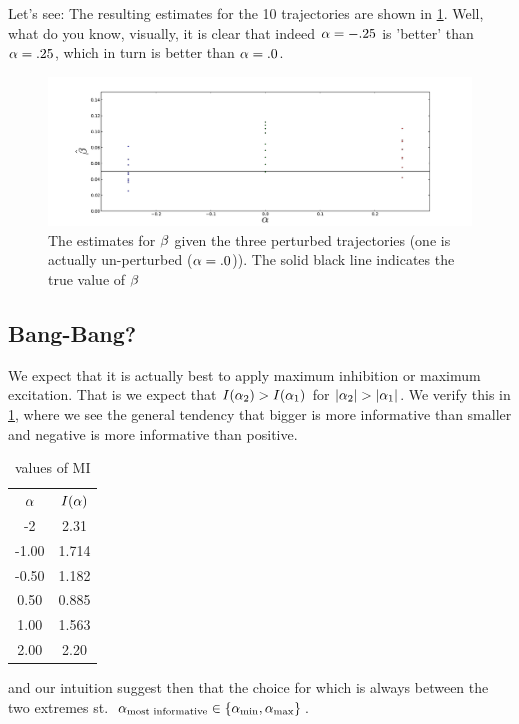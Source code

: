 Let's see: The resulting estimates for the 10 trajectories are shown in
\cref{fig:perturbed_estimates}. Well, what do you know, visually, it is clear
that indeed $\alpha=-.25$ is  'better' than $\alpha=.25$, which in turn is better than $\alpha=.0$.
\begin{figure}
\begin{center}
\includegraphics[width=1\textwidth]{Figs/MIML/perturbed_estimates.pdf}
\caption[]{The estimates for $\beta$ given the three perturbed
trajectories (one is actually un-perturbed ($\alpha=.0$)). The solid black line
indicates the true value of $\beta$}
\label{fig:perturbed_estimates}
\end{center}
\end{figure}

\subsection{Bang-Bang?}
We expect that it is actually best to apply maximum inhibition or maximum
excitation. That is we expect that $I(\alpha_2) > I(\alpha_1)$ for $|\alpha_2| > |\alpha_1|$. We
verify this in \cref{tab:MI_bang_bang_alphas}, where we see the general tendency
that bigger is more informative than smaller and negative is more informative
than positive.
\begin{table}
\begin{centering}
\begin{tabular}{cc}
$\alpha$& $I(\alpha)$ \\
-2&  2.31 \\
-1.00 & 1.714 \\
-0.50 & 1.182 \\
0.50 & 0.885 \\
1.00 & 1.563 \\
2.00 &  2.20 \\
\end{tabular}
\caption{values of MI}
\label{tab:MI_bang_bang_alphas}
\end{centering}
\end{table}
 and our intuition suggest then that the choice
for which is always between the two extremes st.\ $\alpha_{\textrm{most
informative}} \in \{{ \alpha_{\textrm{min}} }, { \alpha_{\textrm{max}} }\}$.


